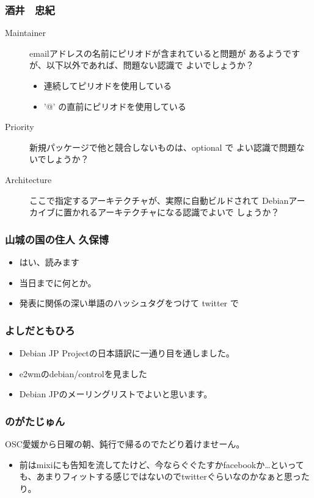 \documentclass[cjk,dvipdfmx,12pt,%
hyperref={bookmarks=true,bookmarksnumbered=true,bookmarksopen=false,%
colorlinks=false,%
pdftitle={第 57 回 関西 Debian 勉強会},%
pdfauthor={倉敷・のがた・河田・佐々木},%
pdfsubject={資料},%
}]{beamer}
\begin{document}
\begin{frame}[fragile]
\frametitle{ 酒井　忠紀 }
\begin{description}
\item[Maintainer]
  emailアドレスの名前にピリオドが含まれていると問題が
  あるようですが、以下以外であれば、問題ない認識で
  よいでしょうか？
  \begin{itemize}
  \item 連続してピリオドを使用している
  \item '@' の直前にピリオドを使用している
  \end{itemize}
\item[Priority]
  新規パッケージで他と競合しないものは、optional で
  よい認識で問題ないでしょうか？
\item[Architecture]
  ここで指定するアーキテクチャが、実際に自動ビルドされて
  Debianアーカイブに置かれるアーキテクチャになる認識でよいで
  しょうか？
\end{description}
\end{frame}

\begin{frame}[fragile]
\frametitle{ 山城の国の住人 久保博 }
  \begin{itemize}
  \item はい、読みます
  \item 当日までに何とか。
  \item 発表に関係の深い単語のハッシュタグをつけて twitter で
  \end{itemize}
\end{frame}

\begin{frame}[fragile]
\frametitle{ よしだともひろ }
  \begin{itemize}
  \item Debian JP Projectの日本語訳に一通り目を通しました。
  \item e2wmのdebian/controlを見ました
  \item Debian JPのメーリングリストでよいと思います。
  \end{itemize}
\end{frame}

\begin{frame}[fragile]
\frametitle{ のがたじゅん }
  OSC愛媛から日曜の朝、鈍行で帰るのでたどり着けませーん。
  \begin{itemize}
  \item 前はmixiにも告知を流してたけど、今ならぐぐたすかfacebookか…といっても、あまりフィットする感じではないのでtwitterぐらいなのかなぁと思ったり。
  \end{itemize}
\end{frame}
\end{document}
